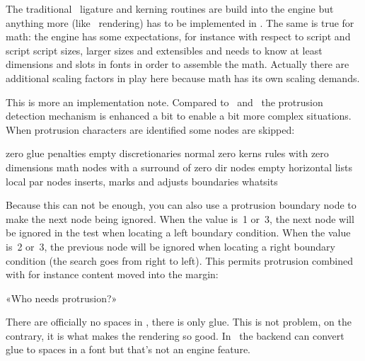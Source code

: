{\stopsection

\startsection[title={Callbacks}]

The traditional \TEX\ ligature and kerning routines are build into the engine but
anything more (like \OPENTYPE\ rendering) has to be implemented in \LUA. The same
is true for math: the engine has some expectations, for instance with respect to
script and script script sizes, larger sizes and extensibles and needs to know at
least dimensions and slots in fonts in order to assemble the math. Actually there
are additional scaling factors in play here because math has its own scaling
demands.

\stopsection

\startsection[title=Protrusion]

This is more an implementation note. Compared to \PDFTEX\ and \LUATEX\ the
protrusion detection mechanism is enhanced a bit to enable a bit more complex
situations. When protrusion characters are identified some nodes are skipped:

\startitem zero glue \stopitem
\startitem penalties \stopitem
\startitem empty discretionaries \stopitem
\startitem normal zero kerns \stopitem
\startitem rules with zero dimensions \stopitem
\startitem math nodes with a surround of zero \stopitem
\startitem dir nodes \stopitem
\startitem empty horizontal lists \stopitem
\startitem local par nodes \stopitem
\startitem inserts, marks and adjusts \stopitem
\startitem boundaries \stopitem
\startitem whatsits \stopitem
\stopitemize

Because this can not be enough, you can also use a protrusion boundary node to
make the next node being ignored. When the value is~1 or~3, the next node will be
ignored in the test when locating a left boundary condition. When the value is~2
or~3, the previous node will be ignored when locating a right boundary condition
(the search goes from right to left). This permits protrusion combined with for
instance content moved into the margin:

\starttyping
{}\llap{!\quad}«Who needs protrusion?»
\stoptyping

\stopsection

\startsection[title=Spaces]

There are officially no spaces in \TEX, there is only glue. This is not problem,
on the contrary, it is what makes the rendering so good. In \CONTEXT\ the backend
can convert glue to spaces in a font but that's not an engine feature.

}
